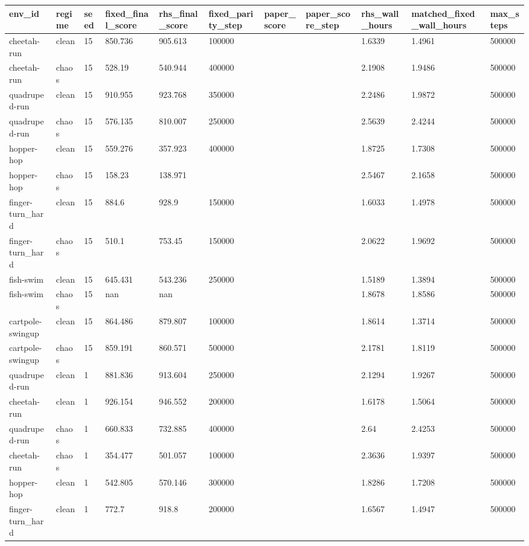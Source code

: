 \begin{tabular}{lllllllllll}
\toprule
env\_id & regime & seed & fixed\_final\_score & rhs\_final\_score & fixed\_parity\_step & paper\_score & paper\_score\_step & rhs\_wall\_hours & matched\_fixed\_wall\_hours & max\_steps \\
\midrule
cheetah-run & clean & 15 & 850.736 & 905.613 & 100000 &  &  & 1.6339 & 1.4961 & 500000 \\
cheetah-run & chaos & 15 & 528.19 & 540.944 & 400000 &  &  & 2.1908 & 1.9486 & 500000 \\
quadruped-run & clean & 15 & 910.955 & 923.768 & 350000 &  &  & 2.2486 & 1.9872 & 500000 \\
quadruped-run & chaos & 15 & 576.135 & 810.007 & 250000 &  &  & 2.5639 & 2.4244 & 500000 \\
hopper-hop & clean & 15 & 559.276 & 357.923 & 400000 &  &  & 1.8725 & 1.7308 & 500000 \\
hopper-hop & chaos & 15 & 158.23 & 138.971 &  &  &  & 2.5467 & 2.1658 & 500000 \\
finger-turn\_hard & clean & 15 & 884.6 & 928.9 & 150000 &  &  & 1.6033 & 1.4978 & 500000 \\
finger-turn\_hard & chaos & 15 & 510.1 & 753.45 & 150000 &  &  & 2.0622 & 1.9692 & 500000 \\
fish-swim & clean & 15 & 645.431 & 543.236 & 250000 &  &  & 1.5189 & 1.3894 & 500000 \\
fish-swim & chaos & 15 & nan & nan &  &  &  & 1.8678 & 1.8586 & 500000 \\
cartpole-swingup & clean & 15 & 864.486 & 879.807 & 100000 &  &  & 1.8614 & 1.3714 & 500000 \\
cartpole-swingup & chaos & 15 & 859.191 & 860.571 & 500000 &  &  & 2.1781 & 1.8119 & 500000 \\
quadruped-run & clean & 1 & 881.836 & 913.604 & 250000 &  &  & 2.1294 & 1.9267 & 500000 \\
cheetah-run & clean & 1 & 926.154 & 946.552 & 200000 &  &  & 1.6178 & 1.5064 & 500000 \\
quadruped-run & chaos & 1 & 660.833 & 732.885 & 400000 &  &  & 2.64 & 2.4253 & 500000 \\
cheetah-run & chaos & 1 & 354.477 & 501.057 & 100000 &  &  & 2.3636 & 1.9397 & 500000 \\
hopper-hop & clean & 1 & 542.805 & 570.146 & 300000 &  &  & 1.8286 & 1.7208 & 500000 \\
finger-turn\_hard & clean & 1 & 772.7 & 918.8 & 200000 &  &  & 1.6567 & 1.4947 & 500000 \\

\end{tabular}
